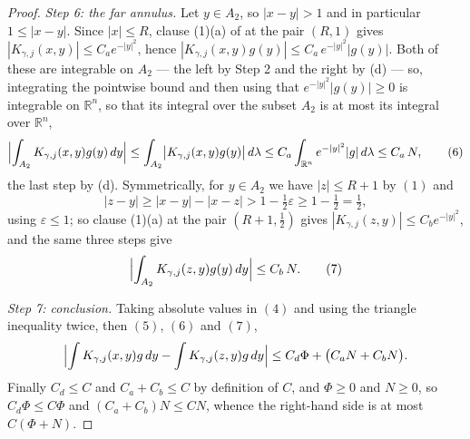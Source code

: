 \begin{proof}
\emph{Step 6: the far annulus.}  Let $y \in A_2$, so $|x-y| > 1$ and in
particular $1 \leq |x-y|$.  Since $|x| \leq R$, clause (1)(a) of
 at the pair $(R,1)$ gives
$|K_{\gamma,j}(x,y)| \leq C_ae^{-|y|^2}$, hence
$|K_{\gamma,j}(x,y)g(y)| \leq C_a\,e^{-|y|^2}|g(y)|$.  Both of these are
integrable on $A_2$ --- the left by Step 2 and the right by (d) --- so,
integrating the pointwise bound and then using that $e^{-|y|^2}|g(y)| \geq 0$
is integrable on $\mathbb{R}^n$, so that its integral over the subset $A_2$ is
at most its integral over $\mathbb{R}^n$,
\begin{equation*}
  \Bigl|\int_{A_2}K_{\gamma,j}(x,y)g(y)\,dy\Bigr|
    \leq \int_{A_2}\bigl|K_{\gamma,j}(x,y)g(y)\bigr|\,d\lambda
    \leq C_a\int_{\mathbb{R}^n}e^{-|y|^2}|g|\,d\lambda
    \leq C_a\,N , \tag{6}
\end{equation*}
the last step by (d).  Symmetrically, for $y \in A_2$ we have $|z| \leq R+1$ by
$(1)$ and
\[
  |z-y| \geq |x-y| - |x-z| > 1 - \tfrac12\varepsilon \geq 1 - \tfrac12
    = \tfrac12 ,
\]
using $\varepsilon \leq 1$; so clause (1)(a) at the pair $(R+1,\tfrac12)$ gives
$|K_{\gamma,j}(z,y)| \leq C_be^{-|y|^2}$, and the same three steps give
\begin{equation*}
  \Bigl|\int_{A_2}K_{\gamma,j}(z,y)g(y)\,dy\Bigr| \leq C_b\,N . \tag{7}
\end{equation*}

\emph{Step 7: conclusion.}  Taking absolute values in $(4)$ and using the
triangle inequality twice, then $(5)$, $(6)$ and $(7)$,
\[
  \Bigl|\int K_{\gamma,j}(x,y)g\,dy - \int K_{\gamma,j}(z,y)g\,dy\Bigr|
    \leq C_d\Phi + \bigl(C_aN + C_bN\bigr) .
\]
Finally $C_d \leq C$ and $C_a + C_b \leq C$ by definition of $C$, and
$\Phi \geq 0$ and $N \geq 0$, so
$C_d\Phi \leq C\Phi$ and $(C_a+C_b)N \leq CN$, whence the right-hand side is at
most $C(\Phi+N)$.
\end{proof}
